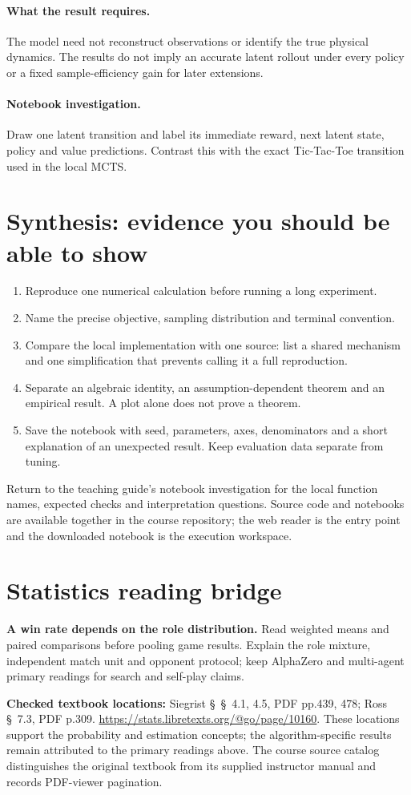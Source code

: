 \documentclass[11pt]{scrartcl}
\begin{document}
\paragraph{What the result requires.} The model need not reconstruct observations or identify the true physical dynamics. The results do not imply an accurate latent rollout under every policy or a fixed sample-efficiency gain for later extensions.

\paragraph{Notebook investigation.} Draw one latent transition and label its immediate reward, next latent state, policy and value predictions. Contrast this with the exact Tic-Tac-Toe transition used in the local MCTS.

\section*{Synthesis: evidence you should be able to show}
\begin{enumerate}
\item Reproduce one numerical calculation before running a long experiment.
\item Name the precise objective, sampling distribution and terminal convention.
\item Compare the local implementation with one source: list a shared mechanism
and one simplification that prevents calling it a full reproduction.
\item Separate an algebraic identity, an assumption-dependent theorem and an
empirical result. A plot alone does not prove a theorem.
\item Save the notebook with seed, parameters, axes, denominators and a short
explanation of an unexpected result. Keep evaluation data separate from tuning.
\end{enumerate}
Return to the teaching guide's notebook investigation for the local function
names, expected checks and interpretation questions. Source code and notebooks
are available together in the course repository; the web reader is the entry
point and the downloaded notebook is the execution workspace.
\section*{Statistics reading bridge}
\textbf{A win rate depends on the role distribution.} Read weighted means and paired comparisons before pooling game results. Explain the role mixture, independent match unit and opponent protocol; keep AlphaZero and multi-agent primary readings for search and self-play claims.

\textbf{Checked textbook locations:} Siegrist \S~\S~4.1, 4.5, PDF pp.439, 478; Ross \S~7.3, PDF p.309. \url{https://stats.libretexts.org/@go/page/10160}. These locations support the probability and estimation concepts; the algorithm-specific results remain attributed to the primary readings above. The course source catalog distinguishes the original textbook from its supplied instructor manual and records PDF-viewer pagination.
\end{document}
